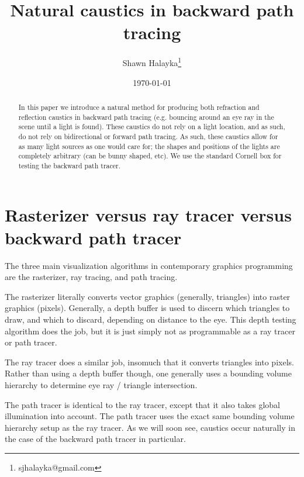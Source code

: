 \documentclass[12pt]{article}
\title{Natural caustics in backward path tracing}
\author{
Shawn Halayka\footnote{sjhalayka@gmail.com}
}
\date{\today\;\currenttime}
\begin{document}
\newcommand{\abs}[1]{\lvert#1\rvert}



\maketitle




\begin{abstract}
In this paper we introduce a natural method for producing both refraction and reflection caustics in backward path tracing (e.g. bouncing around an eye ray in the scene until a light is found).
These caustics do not rely on a light location, and as such, do not rely on bidirectional or forward path tracing.
As such, these caustics allow for as many light sources as one would care for; the shapes and positions of the lights are completely arbitrary (can be bunny shaped, etc).
We use the standard Cornell box for testing the backward path tracer.
\end{abstract}

\section{Rasterizer versus ray tracer versus backward path tracer}

The three main visualization algorithms in contemporary graphics programming are the rasterizer, ray tracing, and path tracing.

The rasterizer literally converts vector graphics (generally, triangles) into raster graphics (pixels).
Generally, a depth buffer is used to discern which triangles to draw, and which to discard, depending on distance to the eye.
This depth testing algorithm does the job, but it is just simply not as programmable as a ray tracer or path tracer.

The ray tracer does a similar job, insomuch that it converts triangles into pixels.
Rather than using a depth buffer though, one generally uses a bounding volume hierarchy to determine eye ray / triangle intersection.

The path tracer is identical to the ray tracer, except that it also takes global illumination into account.
The path tracer uses the exact same bounding volume hierarchy setup as the ray tracer.
As we will soon see, caustics occur naturally in the case of the backward path tracer in particular.
\end{document}
